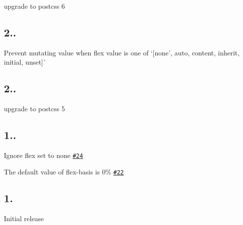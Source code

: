 
\begin{DoxyItemize}
\item upgrade to postcss 6
\end{DoxyItemize}

\subsection*{2..}


\begin{DoxyItemize}
\item Prevent mutating value when flex value is one of `\mbox{[}\textquotesingle{}none', \textquotesingle{}auto\textquotesingle{}, \textquotesingle{}content\textquotesingle{}, \textquotesingle{}inherit\textquotesingle{}, \textquotesingle{}initial\textquotesingle{}, \textquotesingle{}unset\textquotesingle{}\mbox{]}\`{}
\end{DoxyItemize}

\subsection*{2..}


\begin{DoxyItemize}
\item upgrade to postcss 5
\end{DoxyItemize}

\subsection*{1..}


\begin{DoxyItemize}
\item Ignore flex set to none \href{https://github.com/luisrudge/postcss-flexbugs-fixes/pull/24}{\tt \#24}
\item The default value of flex-\/basis is 0\% \href{https://github.com/luisrudge/postcss-flexbugs-fixes/pull/22}{\tt \#22}
\end{DoxyItemize}

\subsection*{1.}


\begin{DoxyItemize}
\item Initial release 
\end{DoxyItemize}